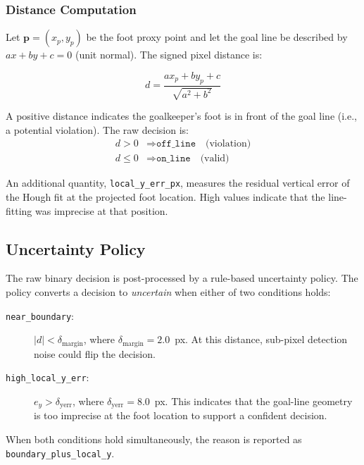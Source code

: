 \documentclass[12pt,a4paper,twoside]{article}
\begin{document}
\subsubsection{Distance Computation}

Let $\mathbf{p} = (x_p, y_p)$ be the foot proxy point and let the goal line be
described by $ax + by + c = 0$ (unit normal). The signed pixel distance is:

\begin{equation}
  d = \frac{a x_p + b y_p + c}{\sqrt{a^2 + b^2}}
\end{equation}

A positive distance indicates the goalkeeper's foot is in front of the goal
line (i.e., a potential violation). The raw decision is:
\begin{align*}
  d > 0 &\Rightarrow \texttt{off\_line} \quad \text{(violation)} \\
  d \leq 0 &\Rightarrow \texttt{on\_line} \quad \text{(valid)}
\end{align*}

An additional quantity, \texttt{local\_y\_err\_px}, measures the residual
vertical error of the Hough fit at the projected foot location. High values
indicate that the line-fitting was imprecise at that position.

\subsection{Uncertainty Policy}

The raw binary decision is post-processed by a rule-based uncertainty policy.
The policy converts a decision to \textit{uncertain} when either of two
conditions holds:

\begin{description}
  \item[\texttt{near\_boundary}:] $|d| < \delta_{\text{margin}}$,
        where $\delta_{\text{margin}} = 2.0$~px. At this distance,
        sub-pixel detection noise could flip the decision.
  \item[\texttt{high\_local\_y\_err}:] $e_y > \delta_{\text{yerr}}$,
        where $\delta_{\text{yerr}} = 8.0$~px. This indicates that the
        goal-line geometry is too imprecise at the foot location to support
        a confident decision.
\end{description}

When both conditions hold simultaneously, the reason is reported as
\texttt{boundary\_plus\_local\_y}.
\end{document}
